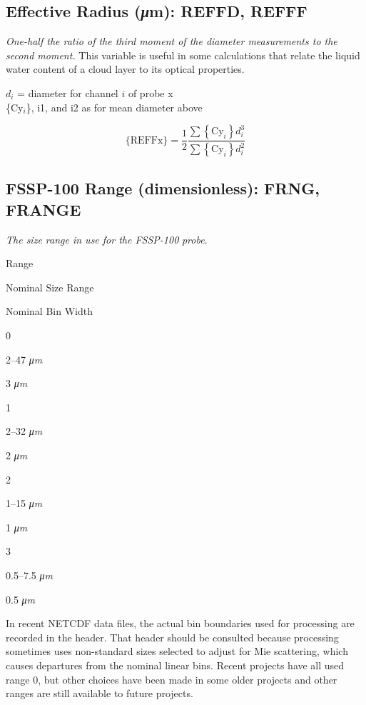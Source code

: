 \documentclass[
]{book}
\begin{document}
\hypertarget{effective-radius}{%
\subsection*{\texorpdfstring{Effective Radius ({\emph{μ}}m): REFFD, REFFF}{Effective Radius (μm): REFFD, REFFF}}\label{effective-radius}}

\emph{One-half the ratio of the third moment of the diameter measurements to the second moment.} This variable is useful in some calculations that relate the liquid water content of a cloud layer to its optical properties.

\(d_{i}\) = diameter for channel \(i\) of probe x\\
\{Cy\(_{i}\)\}, i1, and i2 as for mean diameter above

\begin{equation}
\mathrm{\{REFFx\}}=\frac{1}{2}\frac{\sum{\displaystyle {\displaystyle \left\{ \mathrm{Cy}_{i}\right\} d_{i}^{3}}}}{\sum{\displaystyle {\displaystyle \left\{ \mathrm{Cy}_{i}\right\} d_{i}^{2}}}}
\label{eq:REFFbox}
\end{equation}

\hypertarget{fssp-range}{%
\subsection*{FSSP-100 Range (dimensionless): FRNG, FRANGE}\label{fssp-range}}

\emph{The size range in use for the FSSP-100} \emph{probe}.

Range

Nominal Size Range

Nominal Bin Width

0

2--47 {\emph{μm}}

3 {\emph{μm}}

1

2--32 {\emph{μm}}

2 {\emph{μm}}

2

1--15 {\emph{μm}}

1 {\emph{μm}}

3

0.5--7.5 {\emph{μm}}

0.5 {\emph{μm}}

In recent NETCDF data files, the actual bin boundaries used for processing are recorded in the header. That header should be consulted because processing sometimes uses non-standard sizes selected to adjust for Mie scattering, which causes departures from the nominal linear bins. Recent projects have all used range 0, but other choices have been made in some older projects and other ranges are still available to future projects.
\end{document}

